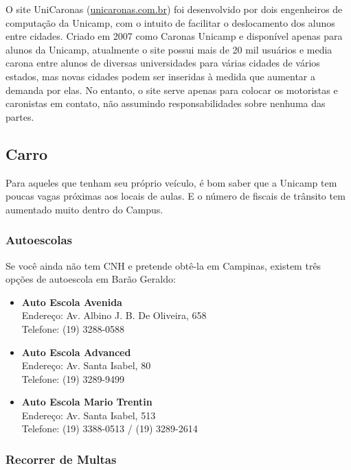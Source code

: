 O site UniCaronas (\url{unicaronas.com.br}) foi desenvolvido por dois
engenheiros de computação da Unicamp, com o intuito de facilitar o deslocamento
dos alunos entre cidades. Criado em 2007 como Caronas Unicamp e disponível 
apenas para alunos da Unicamp, atualmente o site possui mais de 20 mil usuários 
e media carona entre alunos de diversas universidades para várias cidades de 
vários estados, mas novas cidades podem ser inseridas à medida que aumentar a 
demanda por elas. No entanto, o site serve apenas para colocar os motoristas e 
caronistas em contato, não assumindo responsabilidades sobre nenhuma das partes.

\subsection{Carro}

Para aqueles que tenham seu próprio veículo, é bom saber que a Unicamp tem
poucas vagas próximas aos locais de aulas. E o número de fiscais de trânsito tem
aumentado muito dentro do Campus.

\subsubsection*{Autoescolas}

Se você ainda não tem CNH e pretende obtê-la em Campinas, existem três opções de
autoescola em Barão Geraldo:

\begin{itemize}
    \item  \textbf{Auto Escola Avenida}
        \\Endereço: Av. Albino J. B. De Oliveira, 658
        \\Telefone: (19) 3288-0588

    \item  \textbf{Auto Escola Advanced}
        \\Endereço: Av. Santa Isabel, 80
        \\Telefone: (19) 3289-9499

    \item  \textbf{Auto Escola Mario Trentin}
        \\Endereço: Av. Santa Isabel, 513
        \\Telefone: (19) 3388-0513 / (19) 3289-2614
\end{itemize}

\subsubsection*{Recorrer de Multas}

